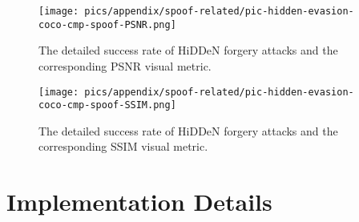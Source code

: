 \begin{figure}[!t]
\begin{minipage}{0.48\linewidth}
    \centering
    \texttt{[image: pics/appendix/spoof-related/pic-hidden-evasion-coco-cmp-spoof-PSNR.png]} 
    
    \vspace{-6mm}
    \caption{The detailed success rate of HiDDeN forgery attacks and the corresponding PSNR visual metric.}
    \label{fig:spoof-related-hidden-psnr}
\end{minipage}\hfill
\begin{minipage}{0.48\linewidth}
    \centering
    \texttt{[image: pics/appendix/spoof-related/pic-hidden-evasion-coco-cmp-spoof-SSIM.png]} 
    
    \vspace{-6mm}
    \caption{The detailed success rate of HiDDeN forgery attacks and the corresponding SSIM visual metric.}
    \label{fig:spoof-related-hidden-ssim}
\end{minipage}
\end{figure}



\section{Implementation Details}\label{sec:Appendix_Implementation Details}

